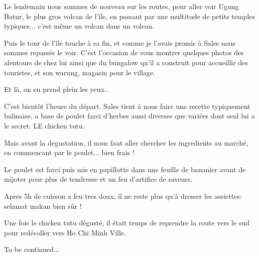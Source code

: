\begin{multicols}{2}

Le lendemain nous sommes de nouveau sur les routes, pour aller voir Ugung Batur, le plus gros volcan de l'île, en passant par une multitude de petits temples typiques... c'est même un volcan dans un volcan.


Puis le tour de l'île touche à sa fin, et comme je l'avais promis à Sales nous sommes repassés le voir. C'est l'occasion de vous montrer quelques photos des alentours de chez lui ainsi que du bungalow qu'il a construit pour accueillir des touristes, et son warung, magasin pour le village.


Et là, on en prend plein les yeux..


C'est bientôt l'heure du départ. Sales tient à nous faire une recette typiquement balinaise, a base de poulet farci d'herbes aussi diverses que variées dont seul lui a le secret: LE chicken tutu.

Mais avant la degustation, il nous faut aller chercher les ingredients au marché, en commencant par le poulet... bien frais !


Le poulet est farci puis mis en papillotte dans une feuille de bananier avant de mijoter pour plus de tendresse et un feu d'artifice de saveurs.


Apres 5h de cuisson a feu tres doux, il ne reste plus qu'à dresser les assiettes: selamat makan bien sûr !


Une fois le chicken tutu dégusté, il était temps de reprendre la route vers le sud pour redécoller vers Ho Chi Minh Ville.

To be continued...

\end{multicols}



